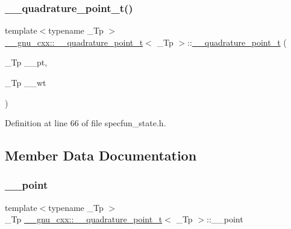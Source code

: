 \subsubsection{\texorpdfstring{\+\_\+\+\_\+quadrature\+\_\+point\+\_\+t()}{\_\_quadrature\_point\_t()}\hspace{0.1cm}{\footnotesize\ttfamily [2/2]}}
{\footnotesize\ttfamily template$<$typename \+\_\+\+Tp $>$ \\
\hyperlink{struct____gnu__cxx_1_1____quadrature__point__t}{\+\_\+\+\_\+gnu\+\_\+cxx\+::\+\_\+\+\_\+quadrature\+\_\+point\+\_\+t}$<$ \+\_\+\+Tp $>$\+::\hyperlink{struct____gnu__cxx_1_1____quadrature__point__t}{\+\_\+\+\_\+quadrature\+\_\+point\+\_\+t} (\begin{DoxyParamCaption}\item[{\+\_\+\+Tp}]{\+\_\+\+\_\+pt,  }\item[{\+\_\+\+Tp}]{\+\_\+\+\_\+wt }\end{DoxyParamCaption})\hspace{0.3cm}{\ttfamily [inline]}}



Definition at line 66 of file specfun\+\_\+state.\+h.



\subsection{Member Data Documentation}
\mbox{\label{struct____gnu__cxx_1_1____quadrature__point__t_a9cbd1d0da59243a75be37c3b54ce7a30}} 
\subsubsection{\texorpdfstring{\+\_\+\+\_\+point}{\_\_point}}
{\footnotesize\ttfamily template$<$typename \+\_\+\+Tp $>$ \\
\+\_\+\+Tp \hyperlink{struct____gnu__cxx_1_1____quadrature__point__t}{\+\_\+\+\_\+gnu\+\_\+cxx\+::\+\_\+\+\_\+quadrature\+\_\+point\+\_\+t}$<$ \+\_\+\+Tp $>$\+::\+\_\+\+\_\+point}



